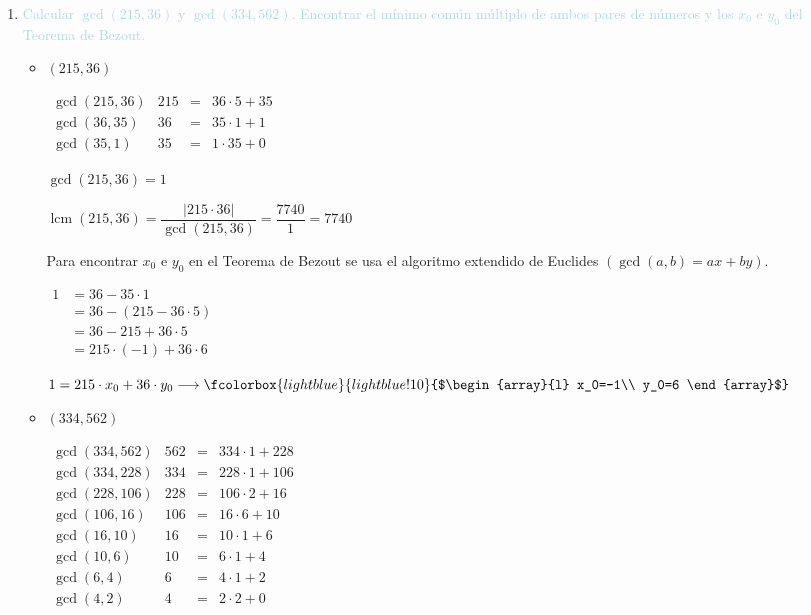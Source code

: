 \documentclass{article}
\newcommand{\bboxed}[1]{\fcolorbox{lightblue}{lightblue!10}{$#1$}}
\newcommand{\lb}[1]{\textcolor{lightblue}{#1}}
\DeclareMathOperator{\lcm}{lcm}
\begin{document}
\begin{enumerate}[label=\color{red}\textbf{\arabic*)}, leftmargin=*]
	\item \lb{Calcular $\gcd(215,36)$ y $\gcd(334,562)$. Encontrar el mínimo común múltiplo de ambos pares de números y los $x_0$ e $y_0$ del Teorema de Bezout.}
	\begin{itemize}[label=\color{lightblue}$-$]
		\item $(215,36)$
		
		$\begin{array}{crcl}
			\gcd(215,36) & 215&=&36\cdot5+35\\
			\gcd(36,35) & 36 &=&35\cdot 1+1\\
			\gcd(35,1) & 35 &=&1\cdot35+0
		\end{array}$
		
		$\gcd(215,36) = 1$
		
		$\lcm(215,36)=\dfrac{|215\cdot36|}{\gcd(215,36)}=\dfrac{7740}{1}=7740$
		
		Para encontrar $x_0$ e $y_0$ en el Teorema de Bezout se usa el algoritmo extendido de Euclides $\left(\gcd(a,b)=ax+by\right)$.
		
		$\begin{aligned}
			1&=36-35\cdot1\\
			&=36-(215-36\cdot5)\\
			&=36-215+36\cdot5\\
			&=215\cdot(-1)+36\cdot6
		\end{aligned}$
		
		$1=215\cdot x_0+36\cdot y_0\longrightarrow\bboxed{\begin{array}{l}
			x_0=-1\\
			y_0=6
		\end{array}}$
		\item $(334,562)$
		
		$\begin{array}{crcl}
			\gcd(334,562) & 562 & = & 334\cdot1+228\\
			\gcd(334,228) & 334 & = & 228\cdot1+106\\
			\gcd(228,106) & 228 & = & 106\cdot2+16\\
			\gcd(106,16) & 106 & = & 16\cdot6+10\\
			\gcd(16,10) & 16 & = & 10\cdot1+6\\
			\gcd(10,6) & 10 & = & 6\cdot1+4\\
			\gcd(6,4) & 6 & = & 4\cdot1+2\\
			\gcd(4,2) & 4 & = & 2\cdot2+0
		\end{array}$
		

\end{itemize}
\end{enumerate}
\end{document}
